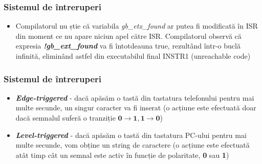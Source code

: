 \documentclass[xcolor={table}]{beamer}
\begin{document}
    	 \begin{frame}
    	    \frametitle{Sistemul de întreruperi}
    	    \begin{itemize}
    	        \item Compilatorul nu știe că variabila \textit{gb\_etx\_found} ar putea fi modificată în ISR din moment ce nu apare niciun apel către ISR. Compilatorul observă că expresia \textit{\textbf{!gb\_ext\_found}} va fi întotdeauna true, rezultând într-o buclă infinită, eliminând astfel din executabilul final INSTR1 (unreachable code)
    	    \end{itemize}
    	 \end{frame}
    	 \begin{frame}
    	    \frametitle{Sistemul de întreruperi}
    	    \centering
    	    \begin{itemize}
    	        \item \textbf{\textit{Edge-triggered}} - dacă apăsăm o tastă din tastatura telefonului pentru mai multe secunde, un singur caracter va fi inserat (o acțiune este efectuată doar dacă semnalul suferă o tranziție $\textbf{0} \rightarrow \textbf{1}, \textbf{1} \rightarrow \textbf{0}$) 
    	        \item \textbf{\textit{Level-triggered}} - dacă apăsăm o tastă din tastatura PC-ului pentru mai multe secunde, vom obține un string de caractere (o acțiune este efectuată atât timp cât un semnal este activ în funcție de polaritate, \textbf{0} sau \textbf{1})
    	    \end{itemize}
    	     \begin{figure}
		        \centering
		    \end{figure}
    	 \end{frame}
	\appendix
\end{document}
